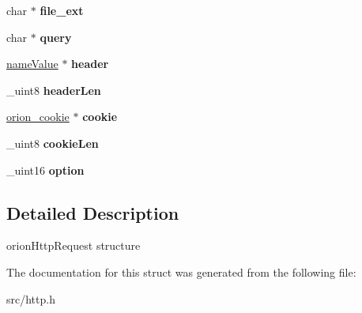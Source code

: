 \begin{DoxyCompactItemize}
\item 
\hypertarget{structorion__httpRequest_a4cf693d1981aa9bda14320010e7c5e60}{
char $\ast$ {\bfseries file\_\-ext}}
\label{structorion__httpRequest_a4cf693d1981aa9bda14320010e7c5e60}

\item 
\hypertarget{structorion__httpRequest_a3282df4577d8ff490b6c98e2f5e09c08}{
char $\ast$ {\bfseries query}}
\label{structorion__httpRequest_a3282df4577d8ff490b6c98e2f5e09c08}

\item 
\hypertarget{structorion__httpRequest_a2bb44c21fd7f0c7e6f3cd181e80da379}{
\hyperlink{structnameValue}{nameValue} $\ast$ {\bfseries header}}
\label{structorion__httpRequest_a2bb44c21fd7f0c7e6f3cd181e80da379}

\item 
\hypertarget{structorion__httpRequest_a63b5d516af47ebd4bc0301d0433fee74}{
\_\-uint8 {\bfseries headerLen}}
\label{structorion__httpRequest_a63b5d516af47ebd4bc0301d0433fee74}

\item 
\hypertarget{structorion__httpRequest_a9adba13db1d2db15bcd6636b2c01a5f2}{
\hyperlink{structorion__cookie}{orion\_\-cookie} $\ast$ {\bfseries cookie}}
\label{structorion__httpRequest_a9adba13db1d2db15bcd6636b2c01a5f2}

\item 
\hypertarget{structorion__httpRequest_ae76edadeb134faa75a7d8d0477748cad}{
\_\-uint8 {\bfseries cookieLen}}
\label{structorion__httpRequest_ae76edadeb134faa75a7d8d0477748cad}

\item 
\hypertarget{structorion__httpRequest_a4eb4a9c724a8e7452422d37ed58b1b22}{
\_\-uint16 {\bfseries option}}
\label{structorion__httpRequest_a4eb4a9c724a8e7452422d37ed58b1b22}

\end{DoxyCompactItemize}


\subsection{Detailed Description}
orionHttpRequest structure 

The documentation for this struct was generated from the following file:\begin{DoxyCompactItemize}
\item 
src/http.h\end{DoxyCompactItemize}
